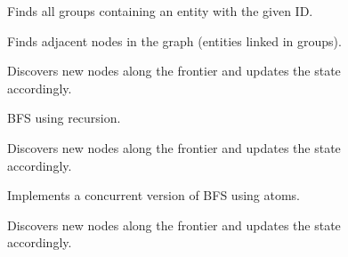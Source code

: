 \documentclass[12pt,letterpaper,oneside,notitlepage]{report}
\theoremstyle{definition}
\begin{document}
    \begin{figure}[ht!]
      
      \caption{Finds all groups containing an entity with the given ID.}
      \label{src:molly-algo-common-find-group-for-id}
    \end{figure}
    
    \begin{figure}[ht!]
      
      \caption{Finds adjacent nodes in the graph (entities linked in groups).}
      \label{src:molly-algo-common-find-adj}
    \end{figure}
    
    \begin{figure}[ht!]
      
      \caption{Discovers new nodes along the frontier and updates the state accordingly.}
      \label{src:molly-algo-bfs-update-adj}
    \end{figure}
    
    \begin{figure}[ht!]
      
      \caption{BFS using recursion.}
      \label{src:molly-algo-bfs-bfs}
    \end{figure}
    
    \begin{figure}[ht!]
      
      \caption{Discovers new nodes along the frontier and updates the state accordingly.}
      \label{src:molly-algo-bfs-atom-update-adj}
    \end{figure}
    
    \begin{figure}[ht!]
      
      \caption{Implements a concurrent version of BFS using atoms.}
      \label{src:molly-algo-bfs-atom-bfs-atom}
    \end{figure}
    
    \begin{figure}[ht!]
      
      \caption{Discovers new nodes along the frontier and updates the state accordingly.}
      \label{src:molly-algo-bfs-ref-update-adj}
    \end{figure}
    
\end{document}
